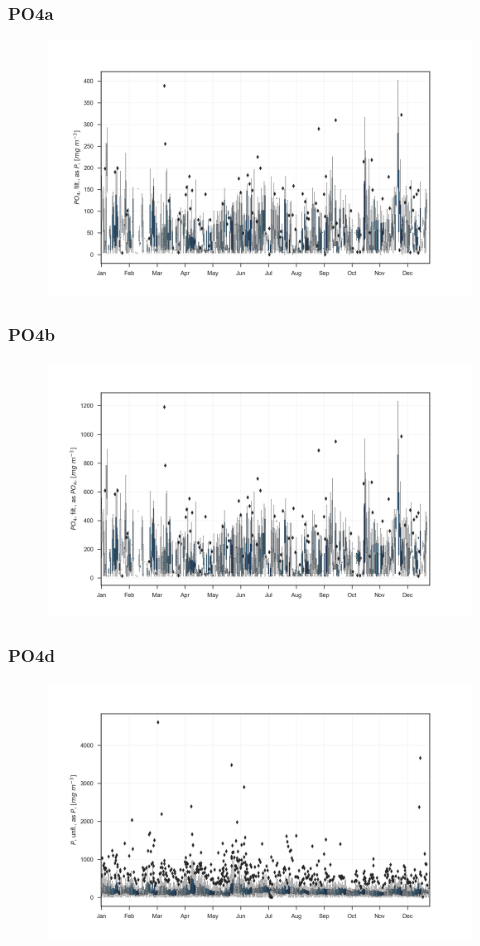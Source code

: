 \documentclass{beamer}
\begin{document}
\begin{frame}
\frametitle{PO4a}
\begin{figure}
\includegraphics[width=\textwidth]{rivers/all/1yr_boxpl/PO4a.png}
\end{figure}
\end{frame}

\begin{frame}
\frametitle{PO4b}
\begin{figure}
\includegraphics[width=\textwidth]{rivers/all/1yr_boxpl/PO4b.png}
\end{figure}
\end{frame}

\begin{frame}
\frametitle{PO4d}
\begin{figure}
\includegraphics[width=\textwidth]{rivers/all/1yr_boxpl/PO4d.png}
\end{figure}
\end{frame}
\end{document}
